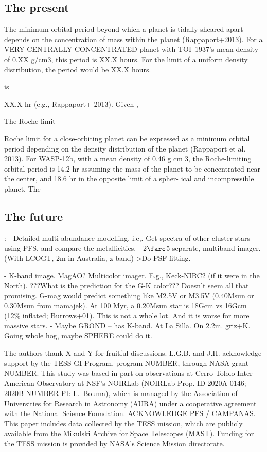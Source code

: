 \documentclass[12pt,twocolumn,tighten]{aastex63}
\newcommand{\tn}{TOI~1937} %
\begin{document}
\subsection{The present}

The minimum orbital period beyond which a planet is tidally sheared
apart depends on the concentration of mass within the planet
(Rappaport+2013).
For a VERY CENTRALLY CONCENTRATED planet with \tn's
mean density of 0.XX g/cm3, this period is XX.X hours.
For the limit of a uniform density distribution, the period would be
XX.X hours.

is 

XX.X hr (e.g., Rappaport+ 2013).
Given ,


The Roche limit 

Roche limit for a close-orbiting planet can
be expressed as a minimum orbital period depending
on the density distribution of the planet (Rappaport
et al. 2013). For WASP-12b, with a mean density of
0.46 g cm􀀀3, the Roche-limiting orbital period is 14.2 hr
assuming the mass of the planet to be concentrated near
the center, and 18.6 hr in the opposite limit of a spher-
ical and incompressible planet. The

\subsection{The future}:
- Detailed multi-abundance modelling.
  i.e,. Get spectra of other cluster stars using PFS, and compare the metallicities.
- 2$\farc$5 separate, multiband imager. (With LCOGT, 2m in Australia,
  z-band)->Do PSF fitting.

- K-band image. MagAO? Multicolor imager.
  E.g., Keck-NIRC2 (if it were in the North).
  ???What is the prediction for the G-K color???
  Doesn't seem all that promising. G-mag would predict something like
  M2.5V or M3.5V (0.40Msun or 0.30Msun from mamajek).
  At 100 Myr, a 0.20Msun star is 18Gcm vs 16Gcm (12\% inflated;
  Burrows+01). This is not a whole lot. And it is worse for more massive
  stars.
- Maybe GROND -- has K-band. At La Silla. On 2.2m.  griz+K.
  Going whole hog, maybe SPHERE could do it.




\acknowledgements
\raggedbottom

The authors thank X and Y for fruitful discussions.
%
L.G.B. and J.H. acknowledge support by the TESS GI Program, program
NUMBER, through NASA grant NUMBER.
%
This study was based in part on observations at Cerro Tololo
Inter-American Observatory at NSF's NOIRLab (NOIRLab Prop. ID
2020A-0146; 2020B-NUMBER PI: L{.}~Bouma), which is managed by the
Association of Universities for Research in Astronomy (AURA) under a
cooperative agreement with the National Science Foundation.
%
ACKNOWLEDGE PFS / CAMPANAS.
%
This paper includes data collected by the TESS mission, which are
publicly available from the Mikulski Archive for Space Telescopes
(MAST).
%
Funding for the TESS mission is provided by NASA's Science Mission
directorate.
%
\end{document}
